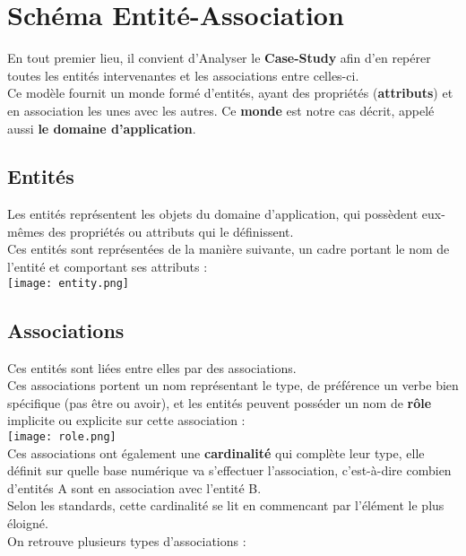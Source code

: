 \documentclass{report}
\begin{document}
	\section{Schéma Entité-Association}

		En tout premier lieu, il convient d'Analyser le \textbf{Case-Study} afin d'en repérer toutes les entités intervenantes et les associations entre celles-ci.\\

		Ce modèle fournit un monde formé d'entités, ayant des propriétés (\textbf{attributs}) et en association les unes avec les autres. Ce \textbf{monde} est notre cas décrit, appelé aussi \textbf{le domaine d'application}.\\

		\subsection{Entités}

			Les entités représentent les objets du domaine d'application, qui possèdent eux-mêmes des propriétés ou attributs qui le définissent.\\
			Ces entités sont représentées de la manière suivante, un cadre portant le nom de l'entité et comportant ses attributs : \\

			\texttt{[image: entity.png]}\\

		\subsection{Associations}

			Ces entités sont liées entre elles par des associations.\\

			Ces associations portent un nom représentant le type, de préférence un verbe bien spécifique (pas être ou avoir), et les entités peuvent posséder un nom de \textbf{rôle} implicite ou explicite sur cette association : \\

			\texttt{[image: role.png]}\\

			Ces associations ont également une \textbf{cardinalité} qui complète leur type, elle définit sur quelle base numérique va s'effectuer l'association, c'est-à-dire combien d'entités A sont en association avec l'entité B.\\
			Selon les standards, cette cardinalité se lit en commencant par l'élément le plus éloigné.\\
			On retrouve plusieurs types d'associations : \\
\end{document}
